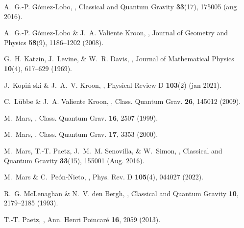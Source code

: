 \documentclass[10pt,a4paper]{article}
\theoremstyle{plain}
\begin{document}
\begin{thebibliography}{10}
A.~G.-P. G{\'{o}}mez-Lobo,
,
\newblock Classical and Quantum Gravity {\bf 33}(17), 175005 (aug 2016).

A.~G.-P. Gómez-Lobo \& J.~A. {Valiente Kroon},
,
\newblock Journal of Geometry and Physics {\bf 58}(9), 1186--1202 (2008).

G.~H. Katzin, J.~Levine, \& W.~R. Davis,
,
\newblock Journal of Mathematical Physics {\bf 10}(4), 617--629 (1969).

J.~Kopi{\'{n} }ski \& J.~A.~V. Kroon,
,
\newblock Physical Review D {\bf 103}(2) (jan 2021).

C.~L\"ubbe \& J.~A. {Valiente Kroon},
,
\newblock Class. Quantum Grav. {\bf 26}, 145012 (2009).

M.~Mars,
,
\newblock Class. Quantum Grav. {\bf 16}, 2507 (1999).

M.~Mars,
,
\newblock Class. Quantum Grav. {\bf 17}, 3353 (2000).

M.~{Mars}, T.-T. {Paetz}, J.~M.~M. {Senovilla}, \& W.~{Simon},
,
\newblock Classical and Quantum Gravity {\bf 33}(15), 155001 (Aug. 2016).

M.~Mars \& C.~Pe\'on-Nieto,
,
\newblock Phys. Rev. D {\bf 105}(4), 044027 (2022).

R.~G. McLenaghan \& N.~V. den Bergh,
,
\newblock Classical and Quantum Gravity {\bf 10}, 2179--2185 (1993).

T.-T. Paetz,
,
\newblock Ann. Henri Poincar\'{e} {\bf 16}, 2059 (2013).


\end{thebibliography}
\end{document}
